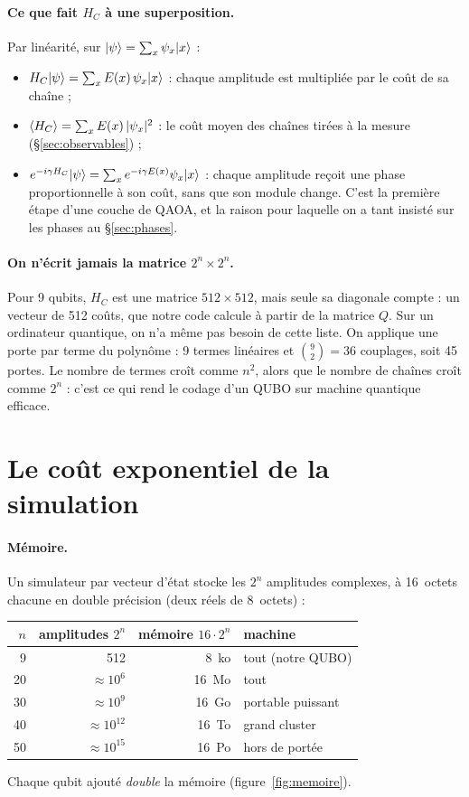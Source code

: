 \paragraph{Ce que fait $H_C$ à une superposition.} Par linéarité, sur $\lvert \psi\rangle=\sum_x\psi_x\lvert x\rangle$ :
\begin{itemize}
\item $H_C\lvert \psi\rangle=\sum_xE(x)\,\psi_x\lvert x\rangle$ : chaque amplitude est multipliée par le coût de sa chaîne ;
\item $\langle H_C\rangle=\sum_xE(x)\,|\psi_x|^2$ : le coût moyen des chaînes tirées à la mesure (§\ref{sec:observables}) ;
\item $e^{-i\gamma H_C}\lvert \psi\rangle=\sum_xe^{-i\gamma E(x)}\psi_x\lvert x\rangle$ : chaque amplitude reçoit une phase proportionnelle à son coût, sans que son module change. C'est la première étape d'une couche de QAOA, et la raison pour laquelle on a tant insisté sur les phases au §\ref{sec:phases}.
\end{itemize}

\paragraph{On n'écrit jamais la matrice $2^n\times2^n$.} Pour 9 qubits, $H_C$ est une matrice $512\times512$, mais seule sa diagonale compte : un vecteur de 512 coûts, que notre code calcule à partir de la matrice $Q$. Sur un ordinateur quantique, on n'a même pas besoin de cette liste. On applique une porte par terme du polynôme : 9 termes linéaires et $\binom92=36$ couplages, soit 45 portes. Le nombre de termes croît comme $n^2$, alors que le nombre de chaînes croît comme $2^n$ : c'est ce qui rend le codage d'un QUBO sur machine quantique efficace.

\section{Le coût exponentiel de la simulation}
\paragraph{Mémoire.} Un simulateur par vecteur d'état stocke les $2^n$ amplitudes complexes, à 16~octets chacune en double précision (deux réels de 8~octets) :
\begin{center}
\begin{tabular}{rrrl}
\toprule
$n$ & amplitudes $2^n$ & mémoire $16\cdot2^n$ & machine \\
\midrule
9 & 512 & 8~ko & tout (notre QUBO) \\
20 & $\approx10^6$ & 16~Mo & tout \\
30 & $\approx10^9$ & 16~Go & portable puissant \\
40 & $\approx10^{12}$ & 16~To & grand cluster \\
50 & $\approx10^{15}$ & 16~Po & hors de portée \\
\bottomrule
\end{tabular}
\end{center}
Chaque qubit ajouté \emph{double} la mémoire (figure~\ref{fig:memoire}).

